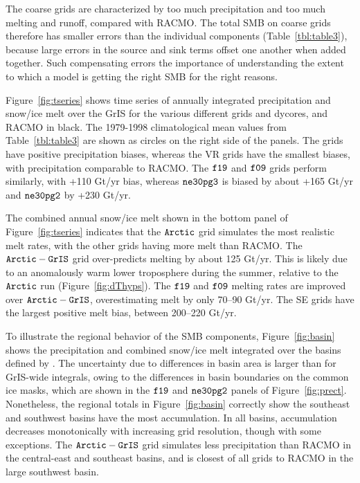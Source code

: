 \documentclass[draft]{agujournal2019}
\begin{document}
The coarse grids are characterized by too much precipitation and too much melting and runoff, compared with RACMO. The total SMB on coarse grids therefore has smaller errors than the individual components (Table~\ref{tbl:table3}), because large errors in the source and sink terms offset one another when added together. Such compensating errors {\color{blue}{underline}} the importance of understanding the extent to which a model is getting the right SMB for the right reasons.

Figure~\ref{fig:tseries} shows time series of annually integrated precipitation and snow/ice melt over the GrIS for the various different grids and dycores, and RACMO in black. The 1979-1998 climatological mean values from Table~\ref{tbl:table3} are shown as circles on the right side of the panels. The {} grids have positive precipitation biases, whereas the VR grids have the smallest biases, with precipitation comparable to RACMO. The $\tt f19$ and $\tt f09$ grids perform similarly, with +110 Gt/yr bias, whereas $\tt ne30pg3$ is biased by about +165 Gt/yr and $\tt ne30pg2$ by +230 Gt/yr.

The combined annual snow/ice melt shown in the bottom panel of Figure~\ref{fig:tseries} indicates that the $\tt Arctic$ grid simulates the most realistic melt rates, with the other grids having more melt than RACMO. The $\tt Arctic-GrIS$ grid over-predicts melting by about 125 Gt/yr. This is likely due to an anomalously warm lower troposphere during the summer, relative to the $\tt Arctic$ run (Figure~\ref{fig:dThyps}). The $\tt f19$ and $\tt f09$ melting rates are improved over $\tt Arctic-GrIS$, overestimating melt by only 70--90 Gt/yr. The SE grids have the largest positive melt bias, between 200--220 Gt/yr.

To illustrate the regional behavior of the SMB components, Figure~\ref{fig:basin} shows the precipitation and combined snow/ice melt integrated over the basins defined by . The uncertainty due to differences in basin area is larger than for GrIS-wide integrals, owing to the differences in basin boundaries on the common ice masks, which are shown in the $\tt f19$ and $\tt ne30pg2$ panels of Figure~\ref{fig:prect}. Nonetheless, the regional totals in Figure~\ref{fig:basin} correctly show the southeast and southwest basins have the most accumulation. In all basins, accumulation decreases monotonically with increasing grid resolution, though with some exceptions. The $\tt Arctic-GrIS$ grid simulates less precipitation than RACMO in the central-east and southeast basins, and is closest of all grids to RACMO in the large southwest basin.
\end{document}
